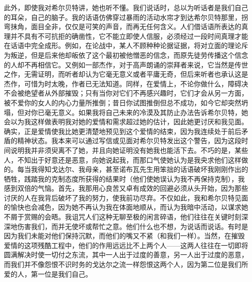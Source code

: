 \par 此外，即使我对希尔贝特讲，她也听不懂。我们说话时，总以为听话者是我们自己的耳朵，自己的脑子。我的话语仿佛穿过暴雨的活动水帘才到达希尔贝特那里，拐弯抹角，面目全非，仅仅是可笑的声音，而再无任何含义。人们借话语所表达的真理并不具有不可抗拒的确凿性，它不能立即使人信服，必须经过一段时间真理才能在话语中完全成形。例如，在论战中，某人不顾种种论据证据，将对立面的理论斥为叛逆，但是后来他却皈依了这个最初被他憎恶的信念，而原先徒劳传播这个信念的人却不再相信它。又例如一部杰作，对于高声朗诵的崇拜者来说，它当然是传世之作，无需证明，而听者却认为它毫无意义或者平庸无奇，但后来听者也承认这是杰作，可惜为时太晚，作者已无法知道。同样，在爱情上，不论你做什么，障碍决不会被绝望者从外部摧毁；只有当你对它们不再感兴趣时，它们才会从另一方面，被不爱你的女人的内心力量所推倒；昔日你试图推倒但总不成功，如今它却突然坍塌，但对你已毫无意义。如果我将自己未来的冷漠及其防止办法告诉希尔贝特，她会以为我这样做表明我对她的爱情和需求超过她的估计，因此她更讨厌和我见面。确实，正是爱情使我比她更清楚地预见到这个爱情的结束，因为我连续处于前后矛盾的精神状态。我本来可以通过写信或见面对希尔贝特发出这个警告，因为这段时间说明我并非须臾离不了她，并且向她证明没有她我也能活下去。不巧的是，某些人，不知出于好意还是恶意，向她说起我，而那口气使她认为是我央求他们这样做的。每当我得知戈达尔、我母亲，甚至诺布瓦先生用笨拙的话语破坏我刚刚作出的牺牲，践踏我的克制态度所获得的结果时（他们使她误认为我不再保持克制），我感到双倍的气恼。首先，我那用心良苦又卓有成效的回避必须从头开始，因为那些讨厌的人在我背后破坏了我的努力，使我前功尽弃。不仅如此，我和希尔贝特见面的愉快也会减色，因为她不再认为我在体面地顺从，而认为我暗中活动，以谋求她不屑于赏赐的会晤。我诅咒人们这种无聊至极的闲言碎语，他们往往在关键时刻深深地伤害我们，而并无使坏或帮忙之意。他们什么也不想，为说话而说话。有时是因为我们未能对他们保持沉默，而他们的嘴又不紧（和我们一样）。当然，在摧毁爱情的这项残酷工程中，他们的作用远远比不上两个人——这两人往往在一切即将圆满解决时使一切付之东流，其中一人出于过度的善意，另一人出于过度的恶意，而我们并不像怨恨不识时务的戈达尔之流一样怨恨这两个人，因为第二位是我们所爱的人，第一位是我们自己。
